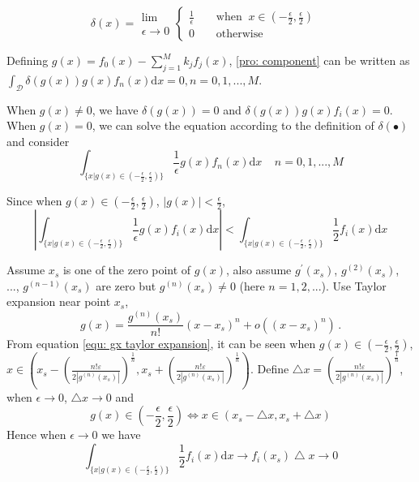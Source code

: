 \documentclass[12pt,journal,a4paper,twoside,onecolumn]{IEEEtran}
\begin{document}
\begin{spacing}{2.5}
\begin{equation}
\label{pro: delta}
\delta(x) = \substack{\lim \\ \epsilon \rightarrow 0} \begin{cases}
\frac{1}{\epsilon}\;\;\;\;&\text{when} \;\;x \in (-\frac{\epsilon}{2}, \frac{\epsilon}{2})\\
0\;\;\;\;&\text{otherwise}
\end{cases} \;\;\;\;
\end{equation}

Defining $g(x) = f_0(x) - \sum_{j=1}^{M} k_jf_j(x)$, \eqref{pro: component} can be written as $\int_{\mathcal{D}}\delta(g(x))g(x)f_n(x)\mathrm{d}x = 0, n = 0, 1, ..., M$.

When $g(x) \neq 0$, we have $\delta(g(x)) = 0$ and $\delta(g(x))g(x)f_i(x) = 0$.   When  $g(x) = 0$, we can solve the equation according to the definition of $\delta(\bullet)$ and consider
\begin{equation}
\label{pro: important}
\int_{\{x|g(x)\in (-\frac{\epsilon}{2}, \frac{\epsilon}{2})\}} \frac{1}{\epsilon} g(x)f_n(x) \mathrm{d}x\;\;\;\;n=0, 1, ..., M
\end{equation}

Since when $g(x) \in (-\frac{\epsilon}{2}, \frac{\epsilon}{2})$, $|g(x)| < \frac{\epsilon}{2}$,
\begin{equation}|
\int_{\{x|g(x)\in (-\frac{\epsilon}{2}, \frac{\epsilon}{2})\}} \frac{1}{\epsilon} g(x)f_i(x) \mathrm{d}x | <
\int_{\{x|g(x)\in (-\frac{\epsilon}{2}, \frac{\epsilon}{2})\}} \frac{1}{2}f_i(x) \mathrm{d}x
\end{equation}

Assume $x_s$ is one of the zero point of $g(x)$, also assume $g^\prime(x_s)$, $g^{(2)}(x_s)$, ..., $g^{(n-1)}(x_s)$ are zero but $g^{(n)}(x_s) \neq 0$ (here $n = 1, 2, ...$). Use Taylor expansion near point $x_s$,
\begin{equation}
  \label{equ: gx taylor expansion}
  g(x) = \frac{g^{(n)}(x_s)}{n!}(x - x_s)^n + o((x - x_s)^n)\,.
\end{equation}
\def \LEFT{ x_s
  -\left(\frac{n!\varepsilon}{2|g^{(n)}(x_s)|}\right)^{\frac{1}{n}}}
  \def \RIGHT{ x_s
  +\left(\frac{n!\varepsilon}{2|g^{(n)}(x_s)|}\right)^{\frac{1}{n}}}
From equation \eqref{equ: gx taylor expansion}, it can be seen when $g(x)\in (-\frac{\epsilon}{2}, \frac{\epsilon}{2})$, $x \in \left(
      \LEFT, \RIGHT
  \right)$.  Define $\bigtriangleup x = \left(\frac{n!\varepsilon}{2|g^{(n)}(x_s)|}\right)^{\frac{1}{n}}$, when $\epsilon \rightarrow 0$, $\bigtriangleup x \rightarrow 0$ and
\begin{equation}
\label{pro: scale}
g(x) \in (-\frac{\epsilon}{2}, \frac{\epsilon}{2})  \Leftrightarrow x \in (x_s -\bigtriangleup x, x_s + \bigtriangleup x)
\end{equation}
 Hence when $\epsilon \rightarrow 0$ we have
\begin{equation}
\int_{\{x|g(x)\in (-\frac{\epsilon}{2}, \frac{\epsilon}{2})\}} \frac{1}{2}f_i(x) \mathrm{d}x \rightarrow
f_i(x_s)\bigtriangleup x \rightarrow 0
\end{equation}


\end{spacing}
\end{document}
